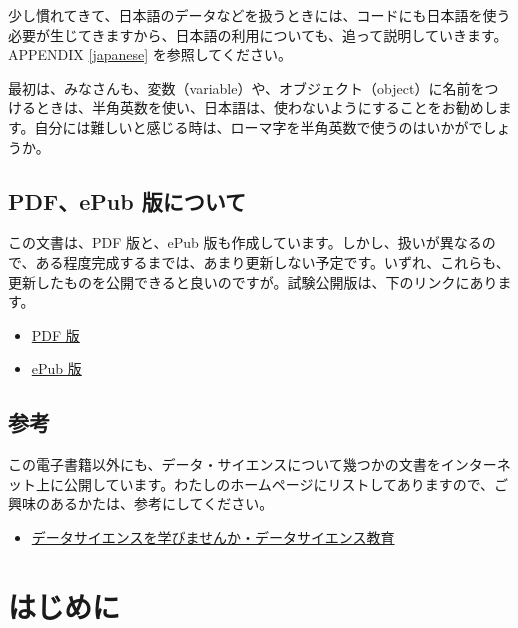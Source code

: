 \documentclass[
  xelatex, ja=standard]{bxjsbook}
\providecommand{\tightlist}{%
  \setlength{\itemsep}{0pt}\setlength{\parskip}{0pt}}
\theoremstyle{definition}
\theoremstyle{definition}
\theoremstyle{definition}
\theoremstyle{definition}
\theoremstyle{remark}
\begin{document}
少し慣れてきて、日本語のデータなどを扱うときには、コードにも日本語を使う必要が生じてきますから、日本語の利用についても、追って説明していきます。APPENDIX \ref{japanese} を参照してください。

最初は、みなさんも、変数（variable）や、オブジェクト（object）に名前をつけるときは、半角英数を使い、日本語は、使わないようにすることをお勧めします。自分には難しいと感じる時は、ローマ字を半角英数で使うのはいかがでしょうか。

\hypertarget{pdfepub-ux7248ux306bux3064ux3044ux3066}{%
\section*{PDF、ePub 版について}\label{pdfepub-ux7248ux306bux3064ux3044ux3066}}

この文書は、PDF 版と、ePub 版も作成しています。しかし、扱いが異なるので、ある程度完成するまでは、あまり更新しない予定です。いずれ、これらも、更新したものを公開できると良いのですが。試験公開版は、下のリンクにあります。

\begin{itemize}
\tightlist
\item
  \href{https://icu-hsuzuki.github.io/ds4aj/ds4aj.pdf}{PDF 版}
\item
  \href{https://icu-hsuzuki.github.io/ds4aj/ds4aj.epub}{ePub 版}
\end{itemize}

\hypertarget{ux53c2ux8003}{%
\section*{参考}\label{ux53c2ux8003}}

この電子書籍以外にも、データ・サイエンスについて幾つかの文書をインターネット上に公開しています。わたしのホームページにリストしてありますので、ご興味のあるかたは、参考にしてください。

\begin{itemize}
\tightlist
\item
  \href{https://icu-hsuzuki.github.io/science/computer/learning/ds.html}{データサイエンスを学びませんか・データサイエンス教育}
\end{itemize}

\hypertarget{introduction}{%
\chapter{はじめに}\label{introduction}}
\end{document}

